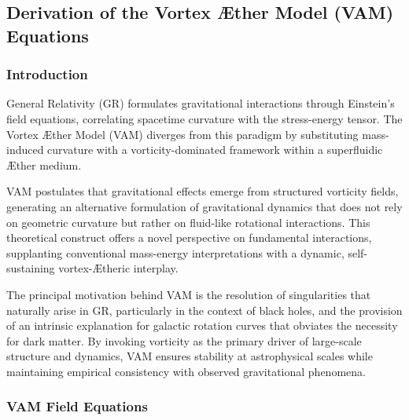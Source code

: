 \subsection{Derivation of the Vortex \AE ther Model (VAM) Equations}

\subsubsection*{Introduction}
General Relativity (GR) formulates gravitational interactions through Einstein's field equations, correlating spacetime curvature with the stress-energy tensor. The Vortex \AE ther Model (VAM) diverges from this paradigm by substituting mass-induced curvature with a vorticity-dominated framework within a superfluidic \AE ther medium.

VAM postulates that gravitational effects emerge from structured vorticity fields, generating an alternative formulation of gravitational dynamics that does not rely on geometric curvature but rather on fluid-like rotational interactions. This theoretical construct offers a novel perspective on fundamental interactions, supplanting conventional mass-energy interpretations with a dynamic, self-sustaining vortex-\AE theric interplay.

The principal motivation behind VAM is the resolution of singularities that naturally arise in GR, particularly in the context of black holes, and the provision of an intrinsic explanation for galactic rotation curves that obviates the necessity for dark matter. By invoking vorticity as the primary driver of large-scale structure and dynamics, VAM ensures stability at astrophysical scales while maintaining empirical consistency with observed gravitational phenomena.

\subsubsection*{VAM Field Equations}

